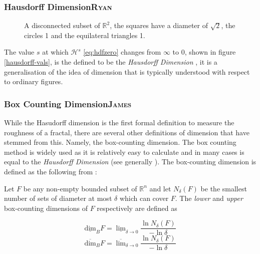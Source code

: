 \documentclass[a4paper,11pt,twoside]{article}
\begin{document}
\subsubsection{Hausdorff Dimension\hfill{}\textsc{Ryan}}
\label{sec:orgec9b7a0}

\begin{figure}
\centering

\caption{\label{abstract-shape}A disconnected subset of \(\mathbb{R}^{2}\), the squares have a diameter of \(\sqrt{2}\), the circles 1 and the equilateral triangles 1.}
\end{figure}


The value \(s\) at which \(\mathcal{H}^{s}\) \eqref{eq:hdfzero} changes from \(\infty\) to 0, shown in figure \ref{hausdorff-vals},  is the defined to be the \emph{Hausdorff Dimension} \cite[\S 2.2]{falconerFractalGeometryMathematical2003b}, it is a generalisation of the idea of dimension that is typically understood with respect to ordinary figures.

\subsubsection{Box Counting Dimension\hfill{}\textsc{James}}
\label{box-count-dim}
While the Hasudorff dimension is the first formal definition to measure
the roughness of a fractal, there are several other definitions of dimension
that have stemmed from this. Namely, the box-counting dimension. The box
counting method is widely used as it is relatively easy to calculate \cite[p. 41]{falconerFractalGeometryMathematical2003b}
and in many cases is equal to the \emph{Hausdorff Dimension}  \cite[p. 11]{markpollicottFractalsDimensionTheory2005} (see generally \cite{ListFractalsHausdorff2020}).
The box-counting dimension is defined as the following from
\cite{falconerFractalGeometryMathematical2003}:

Let \(F\) be any non-empty bounded subset of \(\mathbb{R}^n\) and let \(N_\delta(F)\) be the smallest
number of sets of diameter at most \(\delta\) which can cover \(F\). The \emph{lower} and \emph{upper}
box-counting dimensions of \(F\) respectively are defined as

\begin{equation*}
    \underline{\text{dim}}_BF = \underline{\lim}_{\delta \to 0} \frac{\ln N_\delta(F)}{-\ln \delta}
\end{equation*}
\begin{equation*}
\overline{\text{dim}}_BF = \overline{\lim}_{\delta \to 0} \frac{\ln N_\delta(F)}{-\ln \delta}
\end{equation*}
\end{document}
